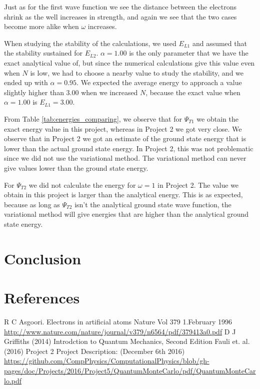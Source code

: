 \documentclass[norsk,a4paper,12pt]{article}
\begin{document}
Just as for the first wave function we see the distance between the electrons shrink as the well increases in strength, and again we see that the two cases become more alike when $\omega$ increases. \par \vspace{3mm}

When studying the stability of the calculations, we used $E_{L1}$ and assumed that the stability sustained for $E_{L2}$. $\alpha=1.00$ is the only parameter that we have the exact analytical value of, but since the numerical calculations give this value even when $N$ is low, we had to choose a nearby value to study the stability, and we ended up with $\alpha=0.95$. We expected the average energy to approach a value slightly higher than 3.00 when we increased $N$, because the exact value when $\alpha=1.00$ is $E_{L1}=3.00$.\par\vspace{3mm} 

From Table \ref{tab:energies_comparing}, we observe that for $\Psi_{T1}$ we obtain the exact energy value in this project, whereas in Project 2 we got very close. We observe that in Project 2 we got an estimate of the ground state energy that is lower than the actual ground state energy. In Project 2, this was not problematic since we did not use the variational method. The variational method can never give values lower than the ground state energy. \par\vspace{3mm}
For $\Psi_{T2}$ we did not calculate the energy for $\omega =1$ in Project 2. The value we obtain in this project is larger than the analytical energy. This is as expected, because as long as $\Psi_{T2}$ isn't the analytical ground state wave function, the variational method  will give energies that are higher than the analytical ground state energy. 


\section{Conclusion} \label{Conclusion}

\newpage
\section{References}
\begingroup
\renewcommand{\section}[2]{}
\begin{thebibliography}{}
  R C Asgoori. 
  Electrons in artificial atoms
  Nature Vol 379 1.February 1996
  \url{http://www.nature.com/nature/journal/v379/n6564/pdf/379413a0.pdf}
  D J Griffiths (2014)
  Introdction to Quantum Mechanics, Second Edition
  Fauli et. al. (2016)
  Project 2
  Project Description: 					(December 6th 2016)\newline
  \url{https://github.com/CompPhysics/ComputationalPhysics/blob/gh-pages/doc/Projects/2016/Project5/QuantumMonteCarlo/pdf/QuantumMonteCarlo.pdf}
  
  
  

\end{thebibliography}
\end{document}
